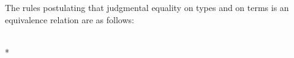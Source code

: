 \begin{samepage}
The rules postulating that judgmental equality on types and on terms is an equivalence relation are as follows:
\begin{center}
\begin{small}
\begin{minipage}{.2\textwidth}
\begin{prooftree}
\end{prooftree}
\end{minipage}
\begin{minipage}{.25\textwidth}
\begin{prooftree}
\end{prooftree}
\end{minipage}
\begin{minipage}{.5\textwidth}
\begin{prooftree}
\end{prooftree}
\end{minipage}
\\*
\bigskip
\begin{minipage}{.2\textwidth}
\begin{prooftree}
\end{prooftree}
\end{minipage}
\begin{minipage}{.25\textwidth}
\begin{prooftree}
\end{prooftree}
\end{minipage}
\begin{minipage}{.5\textwidth}
\begin{prooftree}
\end{prooftree}
\end{minipage}
\end{small}
\end{center}
\end{samepage}

